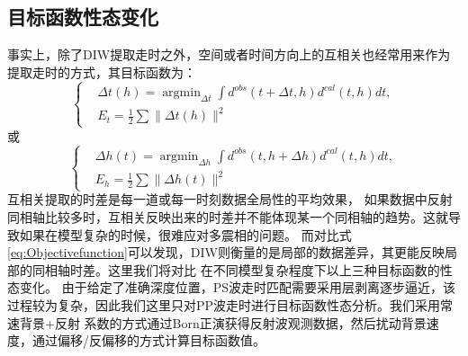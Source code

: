 \subsection{目标函数性态变化}
事实上，除了DIW提取走时之外，空间或者时间方向上的互相关也经常用来作为提取走时的方式\cite{vanLeeuwen:2010,chi2015,Wang2015}，其目标函数为：
\begin{equation}
\left\{
	\begin{aligned}
		&\Delta t(h)=\mathop{\arg\min}_{\Delta t}\int d^{obs}(t+\Delta t,h)d^{cal}(t,h)dt,\\
	&E_t=\frac{1}{2}\sum\parallel \Delta t(h)\parallel ^2
	\end{aligned}
	\right.
    \label{eq:Obj_TimeCorr} 
\end{equation}
或
\begin{equation}
\left\{
	\begin{aligned}
		&\Delta h(t)=\mathop{\arg\min}_{\Delta h}\int d^{obs}(t,h+\Delta h)d^{cal}(t,h)dt,\\
	&E_h=\frac{1}{2}\sum\parallel \Delta h(t)\parallel ^2
	\end{aligned}
	\right.
    \label{eq:Obj_TimeCorr} 
\end{equation}
互相关提取的时差是每一道或每一时刻数据全局性的平均效果，
如果数据中反射同相轴比较多时，互相关反映出来的时差并不能体现某一个同相轴的趋势。这就导致如果在模型复杂的时候，很难应对多震相的问题。
而对比式\ref{eq:Objectivefunction}可以发现，DIW则衡量的是局部的数据差异，其更能反映局部的同相轴时差。这里我们将对比
在不同模型复杂程度下以上三种目标函数的性态变化。
由于给定了准确深度位置，PS波走时匹配需要采用层剥离逐步逼近，该过程较为复杂，因此我们这里只对PP波走时进行目标函数性态分析。我们采用常速背景+反射
系数的方式通过Born正演获得反射波观测数据，然后扰动背景速度，通过偏移/反偏移的方式计算目标函数值。

